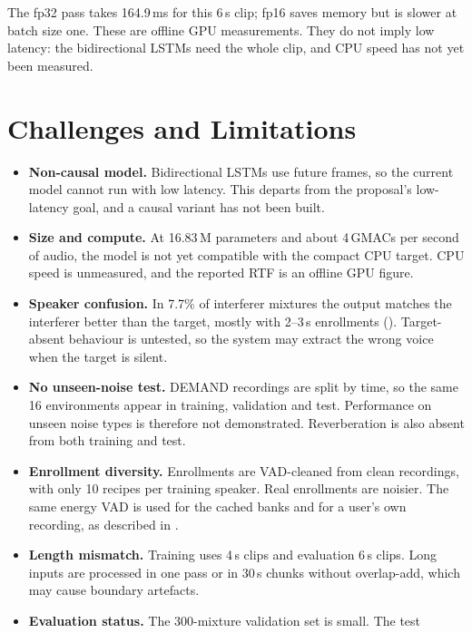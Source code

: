 \documentclass[11pt,a4paper]{article}
\begin{document}
The fp32 pass takes 164.9\,ms for this 6\,s clip; fp16 saves memory but is slower at batch size
one. These are offline GPU measurements. They do not imply low latency: the bidirectional LSTMs
need the whole clip, and CPU speed has not yet been measured.

\section{Challenges and Limitations}
\label{sec:limits}

\begin{itemize}
  \item \textbf{Non-causal model.} Bidirectional LSTMs use future frames, so the current model
        cannot run with low latency. This departs from the proposal's low-latency goal, and a
        causal variant has not been built.
  \item \textbf{Size and compute.} At 16.83\,M parameters and about 4\,GMACs per second of audio,
        the model is not yet compatible with the compact CPU target. CPU speed is unmeasured, and
        the reported RTF is an offline GPU figure.
  \item \textbf{Speaker confusion.} In 7.7\% of interferer mixtures the output matches the
        interferer better than the target, mostly with 2--3\,s enrollments
        (). Target-absent behaviour is untested, so the system may extract the
        wrong voice when the target is silent.
  \item \textbf{No unseen-noise test.} DEMAND recordings are split by time, so the same 16
        environments appear in training, validation and test. Performance on unseen noise types is
        therefore not demonstrated. Reverberation is also absent from both training and test.
  \item \textbf{Enrollment diversity.} Enrollments are VAD-cleaned from clean recordings, with
        only 10 recipes per training speaker. Real enrollments are noisier. The same energy VAD is
        used for the cached banks and for a user's own recording, as described in
        .
  \item \textbf{Length mismatch.} Training uses 4\,s clips and evaluation 6\,s clips. Long inputs
        are processed in one pass or in 30\,s chunks without overlap-add, which may cause boundary
        artefacts.
  \item \textbf{Evaluation status.} The 300-mixture validation set is small. The test

\end{itemize}
\end{document}
